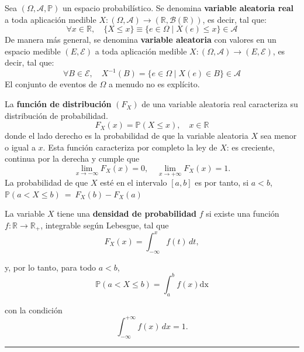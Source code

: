 \begin{f}
	
	Sea \( (\Omega, \mathcal{A}, \mathbb{P})\) un espacio probabilístico. 
	Se denomina \textbf{variable aleatoria real} a toda aplicación medible 
	\(X : (\Omega, \mathcal{A}) \to (\mathbb{R}, \mathcal{B}(\mathbb{R}))\), 
	es decir, tal que:
	\[
	\forall x \in \mathbb{R}, \quad \lbrace X\leq x \rbrace \equiv 
	\lbrace e\in \Omega \mid X(e)\leq x \rbrace \in \mathcal{A}
	\]
	De manera más general, se denomina \textbf{variable aleatoria} con valores en 
	un espacio medible \((E, \mathcal{E})\) a toda aplicación medible 
	\(X : (\Omega, \mathcal{A}) \to (E, \mathcal{E})\), es decir, tal que:
	\[
	\forall B \in \mathcal{E}, \quad X^{-1}(B) = 
	\lbrace e \in \Omega \mid X(e) \in B \rbrace \in \mathcal{A}
	\]
	El conjunto de eventos de \(\Omega\) a menudo no es explícito.
	
	La \textbf{función de distribución} \((F_X)\) de una variable aleatoria real caracteriza su distribución de probabilidad.
	\[
	F_X(x)=\mathbb {P}(X\leq x), \quad  x\in \mathbb{R}
	\]
	donde el lado derecho es la probabilidad de que la variable aleatoria \(X\) sea menor o igual a \(x\). Esta función caracteriza por completo la ley de \(X\): es creciente, continua por la derecha y cumple que
	\[
	\lim_{x\to -\infty} F_X(x)=0, \quad \lim_{x\to +\infty} F_X(x)=1.
	\]
	La probabilidad de que \(X\) esté en el intervalo \([a, b]\) es por tanto, si \(a< b\),
	\(
	\mathbb{P}(a< X\leq b)\ =\ F_X(b)-F_X(a)
	\)
	
	La variable \(X\) tiene una  \textbf{densidad de probabilidad} \(f\) si existe una función \(f : \mathbb{R} \to \mathbb{R}_+\), integrable según Lebesgue, tal que
	\[
	F_X(x)=\int_{-\infty}^x f(t)\,dt,
	\]
\begin{minipage}[][][]{0.49\linewidth}
		y, por lo tanto, para todo \(a<b\),    
	\[
	\mathbb{P}(a< X\leq b)=\int_a^b f(x) \mathrm{dx}
	\]
\end{minipage}\hfill
\vrule
\hfill	
\begin{minipage}[][][]{0.49\linewidth}
con la condición 
	\[
	\int_{-\infty}^{+\infty} f(x)\,dx = 1.
	\]
\end{minipage}
\end{f}
\hrule
